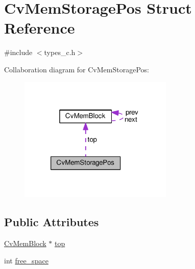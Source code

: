 \hypertarget{structCvMemStoragePos}{\section{Cv\-Mem\-Storage\-Pos Struct Reference}
\label{structCvMemStoragePos}
}


{\ttfamily \#include $<$types\-\_\-c.\-h$>$}



Collaboration diagram for Cv\-Mem\-Storage\-Pos\-:\nopagebreak
\begin{figure}[H]
\begin{center}
\leavevmode
\includegraphics[width=208pt]{structCvMemStoragePos__coll__graph}
\end{center}
\end{figure}
\subsection*{Public Attributes}
\begin{DoxyCompactItemize}
\item 
\hyperlink{structCvMemBlock}{Cv\-Mem\-Block} $\ast$ \hyperlink{structCvMemStoragePos_a5dbe929a3c285cd5d6495263ff4f8593}{top}
\item 
int \hyperlink{structCvMemStoragePos_adcef7e0c6477fca4e2c1f418581d59ae}{free\-\_\-space}
\end{DoxyCompactItemize}


